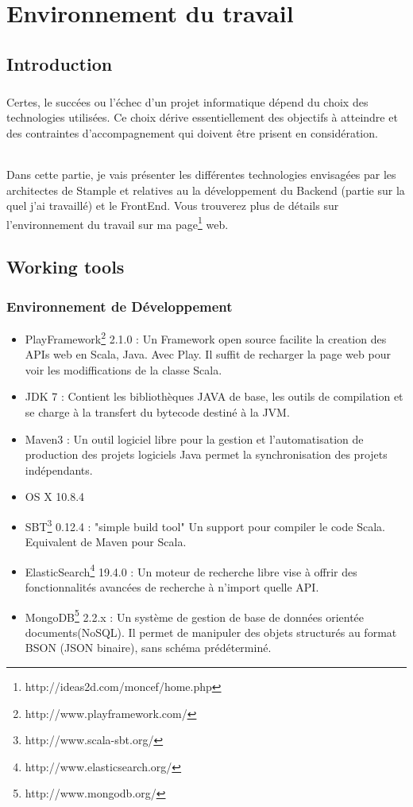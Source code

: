 \chapter{Environnement du travail}
\section{Introduction}
\paragraph{}
Certes, le succées ou l'échec d'un projet informatique dépend du choix des technologies utilisées.
Ce choix dérive essentiellement des objectifs à atteindre et des contraintes d'accompagnement qui doivent être prisent en considération.
\subparagraph{}
Dans cette partie, je vais présenter les différentes technologies envisagées par les architectes de Stample 
et relatives au la développement du Backend (partie sur la quel j'ai travaillé) et le FrontEnd.
Vous trouverez plus de détails sur l'environnement du travail sur ma page\footnote{http://ideas2d.com/moncef/home.php} web.
\section{Working tools}
\subsection{Environnement de Développement}
\begin{itemize}
\item PlayFramework\footnote{http://www.playframework.com/} 2.1.0 : Un Framework open source facilite la creation des APIs web en Scala, Java. Avec Play. Il suffit de recharger la page web pour voir les modiffications de la classe Scala.
\item JDK 7 : Contient les bibliothèques JAVA de base, les outils de compilation et se charge à la transfert du bytecode destiné à la JVM. 
\item Maven3 : Un outil logiciel libre pour la gestion et l'automatisation de production des projets logiciels Java permet la synchronisation des projets indépendants.
\item OS X 10.8.4
\item SBT\footnote{http://www.scala-sbt.org/} 0.12.4 : "simple build tool" Un support pour compiler le code Scala. Equivalent de Maven pour Scala.
\item ElasticSearch\footnote{http://www.elasticsearch.org/} 19.4.0 :  Un moteur de recherche libre vise à offrir des fonctionnalités avancées de recherche à n'import quelle API.
\item MongoDB\footnote{http://www.mongodb.org/} 2.2.x : Un système de gestion de base de données orientée documents(NoSQL). Il permet de manipuler des objets structurés au format BSON (JSON binaire), sans schéma prédéterminé.
\end{itemize}
